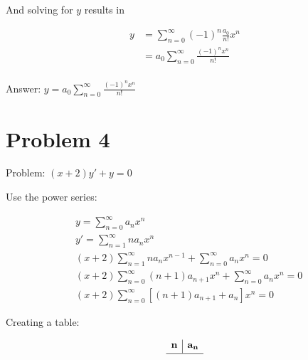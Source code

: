 \documentclass[11pt]{article}
\begin{document}
And solving for $y$ results in

\[
\begin{aligned}
    y & = \sum_{n = 0}^{\infty} (-1)^{n} \frac{a_{0}}{n!} x^{n} \\
    & = a_{0} \sum_{n = 0}^{\infty} \frac{(-1)^{n} x^{n}}{n!} \\
\end{aligned}
\]

Answer: $\boxed{y = a_{0} \sum_{n = 0}^{\infty} \frac{(-1)^{n} x^{n}}{n!}}$

\section*{Problem 4}

Problem: $(x+2)y' + y = 0$

Use the power series:

\[
\begin{aligned}
    & y = \sum_{n = 0}^{\infty} a_{n}x^{n} \\
    & y' = \sum_{n = 1}^{\infty} na_{n}x^{n} \\
    & (x+2) \sum_{n = 1}^{\infty} na_{n}x^{n-1}
    + \sum_{n = 0}^{\infty} a_{n}x^{n} = 0 \\
    & (x+2) \sum_{n = 0}^{\infty} (n+1)a_{n+1}x^{n}
    + \sum_{n = 0}^{\infty} a_{n}x^{n} = 0 \\
    & (x+2) \sum_{n=0}^{\infty} [(n+1)a_{n+1} + a_{n}]
    x^{n} = 0
\end{aligned}
\]

Creating a table:

\[
\begin{array}{c|c}
    \mathbf{n} & \mathbf{a_{n}} \\
    [2px] \hline
    
\end{array}
\]
\end{document}
